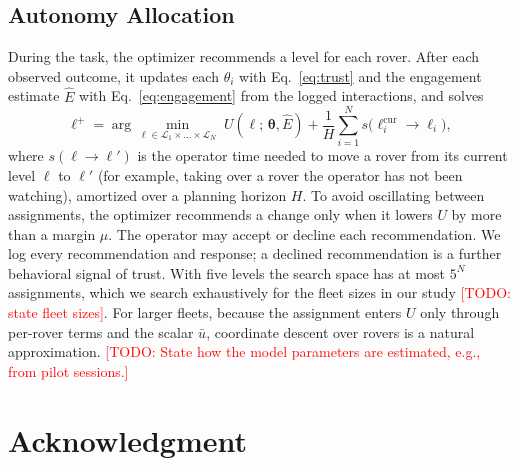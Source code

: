 \documentclass[conference]{IEEEtran}
\newcommand{\todo}[1]{\textcolor{red}{[TODO: #1]}}
\begin{document}
\subsection{Autonomy Allocation}
\label{sec:allocation}
During the task, the optimizer recommends a level for each rover.
After each observed outcome, it updates each $\theta_i$ with
Eq.~\eqref{eq:trust} and the engagement estimate $\hat{E}$ with
Eq.~\eqref{eq:engagement} from the logged interactions, and solves
\begin{equation}
  \boldsymbol{\ell}^{+} = \arg\min_{\boldsymbol{\ell} \in
  \mathcal{L}_1 \times \dots \times \mathcal{L}_N}
  \; U(\boldsymbol{\ell};\, \boldsymbol{\theta}, \hat{E})
  + \frac{1}{H} \sum_{i=1}^{N} s\big(\ell_i^{\mathrm{cur}} \to \ell_i\big),
  \label{eq:allocation}
\end{equation}
where $s(\ell \to \ell')$ is the operator time needed to move a rover
from its current level $\ell$ to $\ell'$ (for example, taking over a
rover the operator has not been watching), amortized over a planning
horizon $H$. To avoid oscillating between assignments, the optimizer
recommends a change only when it lowers $U$ by more than a margin
$\mu$. The operator may accept or decline each recommendation. We log
every recommendation and response; a declined recommendation is a
further behavioral signal of trust. With five levels the search space
has at most $5^N$ assignments, which we search exhaustively for the
fleet sizes in our study \todo{state fleet sizes}. For larger fleets,
because the assignment enters $U$ only through per-rover terms and the
scalar $\bar{u}$, coordinate descent over rovers is a natural
approximation. \todo{State how the model parameters are estimated,
e.g., from pilot sessions.}



\section*{Acknowledgment}



\end{document}
